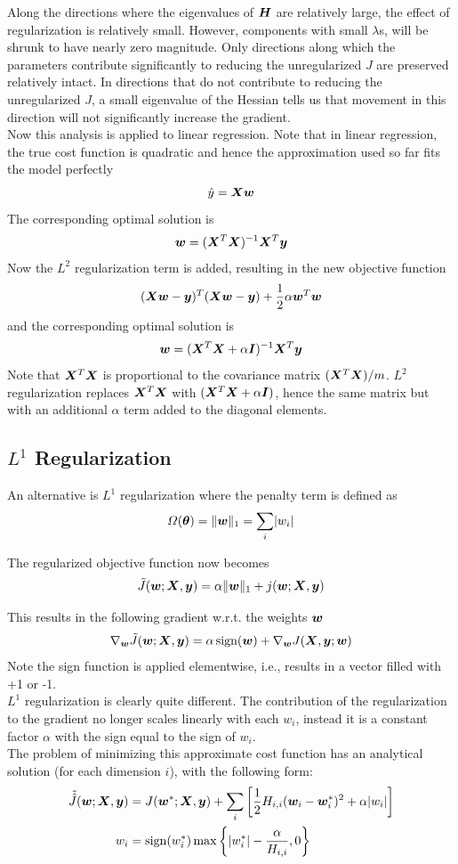 \begin{multicols}{2}
	Along the directions where the eigenvalues of ${\bm{H}}$ are relatively large, the effect of regularization is relatively small.
	However, components with small $\lambda$s, will be shrunk to have nearly zero magnitude.
	Only directions along which the parameters contribute significantly to reducing the unregularized $J$ are preserved relatively intact. In directions that do not contribute to reducing the unregularized $J$, a small eigenvalue of the Hessian tells us that movement in this direction will not significantly increase the gradient.\\
	
	Now this analysis is applied to linear regression.
	Note that in linear regression, the true cost function is quadratic and hence the approximation used so far fits the model perfectly
	\[ \hat{y} = {\bm{X}}{\bm{w}} \]
	The corresponding optimal solution is
	\[ {\bm{w}} = ({\bm{X}}^T{\bm{X}})^{-1}{\bm{X}}^T{\bm{y}} \]
	Now the $L^2$ regularization term is added, resulting in the new objective function
	\[ ({\bm{X}}{\bm{w}}-{\bm{y}})^T({\bm{X}}{\bm{w}}-{\bm{y}})+\frac{1}{2}\alpha{\bm{w}}^T{\bm{w}} \]
	and the corresponding optimal solution is
	\[ {\bm{w}} = ({\bm{X}}^T{\bm{X}}+\alpha{\bm{I}})^{-1}{\bm{X}}^T{\bm{y}} \]
	Note that ${\bm{X}}^T{\bm{X}}$ is proportional to the covariance matrix $({\bm{X}}^T{\bm{X}})/m$.
	$L^2$ regularization replaces ${\bm{X}}^T{\bm{X}}$ with $({\bm{X}}^T{\bm{X}}+\alpha{\bm{I}})$, hence the same matrix but with an additional $\alpha$ term added to the diagonal elements.
	
	\subsection{$L^1$ Regularization}
	An alternative is $L^1$ regularization where the penalty term is defined as
	\[ \Omega(\bolt) = \lVert\vw\rVert_1 = \sum_i \lvert w_i\rvert \]
	
	The regularized objective function now becomes
	\[ \tilde{J}({\bm{w}};{\bm{X}},{\bm{y}}) = \alpha\lVert{\bm{w}}\rVert_1+j({\bm{w}};{\bm{X}},{\bm{y}}) \]
	
	This results in the following gradient w.r.t. the weights ${\bm{w}}$
	\[ \nabla_{\bm{w}} \tilde{J}({\bm{w}};{\bm{X}},{\bm{y}})=\alpha \operatorname{sign}({\bm{w}})+\nabla_{\bm{w}} J({\bm{X}},{\bm{y}};{\bm{w}}) \]
	Note the sign function is applied elementwise, i.e., results in a vector filled with +1 or -1.\\
	$L^1$ regularization is clearly quite different. The contribution of the regularization to the gradient no longer scales linearly with each $w_i$, instead it is a constant factor $\alpha$ with the sign equal to the sign of $w_i$.\\
	
	The problem of minimizing this approximate cost function has an analytical solution (for each dimension $i$), with the following form:
	\begin{align*}
	\tilde{\hat{J}}({\bm{w}};{\bm{X}},{\bm{y}}) 
	&= J({\bm{w}}^\ast;{\bm{X}},{\bm{y}})+\sum_i\left[\frac{1}{2} H_{i,i}({\bm{w}}_i-{\bm{w}}_i^\ast)^2+\alpha\lvert w_i\rvert\right]\\
	w_i &= \operatorname{sign}(w_i^\ast)\max\left\{ \lvert w_i^\ast\rvert-\frac{\alpha}{H_{i,i}},0 \right\}
	\end{align*}
	

\end{multicols}
